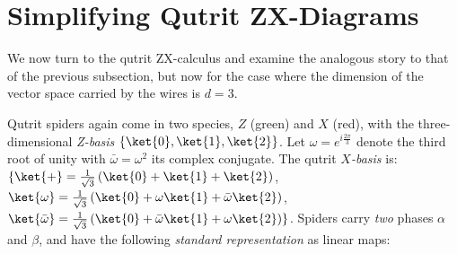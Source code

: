 \section{Simplifying Qutrit ZX-Diagrams}\label{sec:qutrits}

We now turn to the qutrit ZX-calculus and examine the analogous story to that of the previous subsection,
but now for the case where the dimension of the vector space carried by the wires is $d=3$.

Qutrit spiders again come in two species,
$Z$ (green) and $X$ (red),
with the three-dimensional \emph{Z-basis} $\{\ket{0},\ket{1},\ket{2}\}$.
Let $\omega = e^{i \frac{2\pi}{3}}$ denote the third root of unity
with $\bar\omega = \omega^2$ its complex conjugate.
The qutrit \emph{$X$-basis} is:
$\{ \ket{+} = \frac{1}{\sqrt{3}} \left(\ket{0} + \ket{1} + \ket{2}\right)$,
$\ket{\omega} = \frac{1}{\sqrt{3}} \left(\ket{0} + \omega\ket{1} + \bar{\omega}\ket{2}\right)$,
$\ket{\bar{\omega}} = \frac{1}{\sqrt{3}} \left(\ket{0} + \bar{\omega}\ket{1} + \omega\ket{2}\right) \} $.
Spiders carry \emph{two} phases $\alpha$ and $\beta$,
and have the following \emph{standard representation} as linear maps:
\begingroup
	\allowdisplaybreaks
	\setlength{\jot}{10pt}
